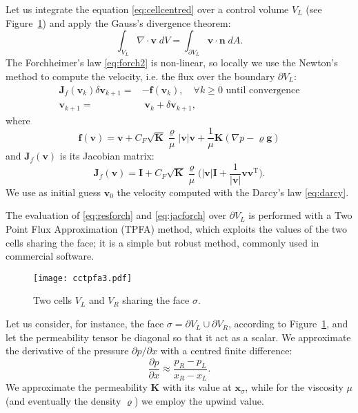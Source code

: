 Let us integrate the equation \eqref{eq:cellcentred} over a control volume 
$V_L$ (see Figure~\ref{fig:cctpfa}) and apply the Gauss's divergence theorem:
\begin{equation}
\int_{V_L} \nabla \cdot \mathbf{v} \; dV = \int_{\partial V_L} \mathbf{v} \cdot 
\mathbf{n} \; dA.
\end{equation}
The Forchheimer's law \eqref{eq:forch2} is non-linear, so locally we use the Newton's 
method to compute the velocity, i.e. the flux over the boundary 
$\partial V_L$:
\begin{align}
	\label{eq:forchnewton} \mathbf{J}_f(\mathbf{v}_k) \delta \mathbf{v}_{k+1} = &-\mathbf{f}(\mathbf{v}_k), \quad \text{$\forall k\geq 0$ until 
	convergence}\\
	\label{eq:forchnewton2} \mathbf{v}_{k+1} = &\;\mathbf{v}_k + \delta \mathbf{v}_{k+1},
\end{align}
where
\begin{equation} \label{eq:resforch}
	\mathbf{f}(\mathbf{v}) = \mathbf{v} + C_F \sqrt{\mathbf{K}} 
	\frac{\varrho}{\mu} 
	|\mathbf{v}|\mathbf{v} + \frac{1}{\mu} \mathbf{K}(\nabla p - \varrho 
	\mathbf{g} )
\end{equation}
and $\mathbf{J}_f(\mathbf{v})$ is its Jacobian matrix:
\begin{equation} \label{eq:jacforch}
\mathbf{J}_f(\mathbf{v}) = \mathbf{I} + 
C_F\sqrt{\mathbf{K}}\frac{\varrho}{\mu}\big(|\mathbf{v}|\mathbf{I} + 
\frac{1}{|\mathbf{v}|}{\mathbf{v}\mathbf{v}^\mathrm{T}}\big).
\end{equation}
We use as initial guess $\mathbf{v}_0$ the velocity computed with the Darcy's 
law \eqref{eq:darcy}.

The evaluation of \eqref{eq:resforch} and \eqref{eq:jacforch} over $\partial 
V_L$ is performed with a Two Point Flux Approximation (TPFA) method, which 
exploits the values of the two cells sharing the face; it is a 
simple but robust method, commonly used in commercial software.
\begin{figure}
	\centering
	\texttt{[image: cctpfa3.pdf]}
	\caption[Two cells $V_L$ and $V_R$ sharing the face $\sigma$]{Two cells 
	$V_L$ and $V_R$ sharing the face $\sigma$.}
	\label{fig:cctpfa}
\end{figure}
Let us consider, for instance, the face $\sigma = \partial V_L \cup \partial 
V_R$, according to Figure~\ref{fig:cctpfa}, and let the permeability tensor be 
diagonal so that it act as a scalar. We approximate the derivative of the 
pressure $\partial p /\partial 
x$ with a centred finite difference:
\begin{equation}
\frac{\partial p}{\partial x} \approx \frac{p_R-p_L}{x_R -x_L}.
\end{equation}
We approximate the permeability $\mathbf{K}$ with its value at 
$\mathbf{x}_\sigma$, while 
for the viscosity $\mu$ (and eventually the density $\varrho$) we employ the 
upwind value.

